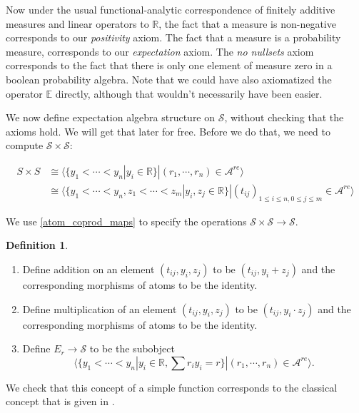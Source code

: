 \documentclass[a4paper]{amsproc}
\theoremstyle{plain}
\theoremstyle{definition}
\newtheorem{definition}[theorem]{Definition}
\theoremstyle{remark}
\numberwithin{equation}{section}
\begin{document}
Now under the usual functional-analytic correspondence of finitely additive measures and linear operators to $\mathbb{R}$, the fact that a measure is non-negative corresponds to our \emph{positivity} axiom. The fact that a measure is a probability measure, corresponds to our \emph{expectation} axiom. The \emph{no nullsets} axiom corresponds to the fact that there is only one element of measure zero in a boolean probability algebra. Note that we could have also axiomatized the operator $\mathbb{E}$ directly, although that wouldn't necessarily have been easier.

We now define expectation algebra structure on $\mathcal{S}$, without checking that the axioms hold. We will get that later for free. Before we do that, we need to compute $\mathcal{S} \times \mathcal{S}$:

\begin{align*}
    S \times S &\cong \langle \{y_1 < \cdots < y_n | y_i \in \mathbb{R} \} | (r_1, \cdots, r_n) \in \mathcal{A}^{re} \rangle \\
    &\cong \langle \{y_1 < \cdots < y_n, z_1 < \cdots < z_m | y_i, z_j \in \mathbb{R} \} | (t_{ij})_{1 \leq i \leq n, 0 \leq j \leq m} \in \mathcal{A}^{re} \rangle
\end{align*}

We use \ref{atom_coprod_maps} to specify the operations $\mathcal{S} \times \mathcal{S} \to \mathcal{S}$.

\begin{definition}
    \begin{enumerate}
        \item Define addition on an element $(t_{ij}, y_i, z_j)$ to be $(t_{ij}, y_i + z_j)$ and the corresponding morphisms of atoms to be the identity.
        \item Define multiplication of an element $(t_{ij}, y_i, z_j)$ to be $(t_{ij}, y_i \cdot z_j)$ and the corresponding morphisms of atoms to be the identity.
        \item Define $E_r \to \mathcal{S}$ to be the subobject
        \[
            \langle \{y_1 < \cdots < y_n | y_i \in \mathbb{R}, \sum r_i y_i = r \} | (r_1, \cdots, r_n) \in \mathcal{A}^{re} \rangle .
        \]
    \end{enumerate}
\end{definition}


We check that this concept of a simple function corresponds to the classical concept that is given in \cite{fremlin}. %
\end{document}

